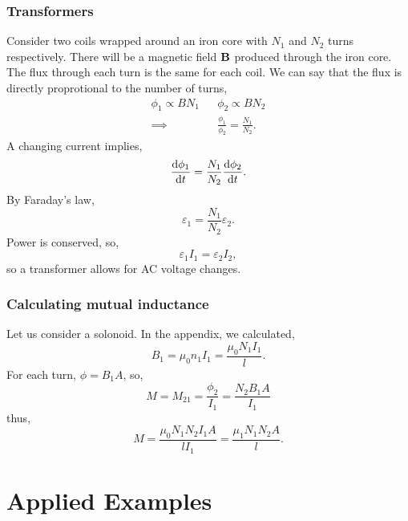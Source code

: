 \documentclass{book}
\begin{document}
\subsection{Transformers}
Consider two coils wrapped around an iron core with $N_1$ and $N_2$ turns respectively. There will be a magnetic field $\vb{B}$ produced through the iron core. The flux through each turn is the same for each coil. We can say that the flux is directly proprotional to the number of turns,
\begin{align}
	\phi_1 \propto BN_1 && \phi_2 \propto BN_2 \\
	\implies && \frac{\phi_1}{\phi_2} = \frac{N_1}{N_2}.
\end{align}
A changing current implies,
\begin{equation}
	\dv{\phi_1}{t} = \frac{N_1}{N_2}\dv{\phi_2}{t}.
\end{equation}
By Faraday's law,
\begin{equation}
	\varepsilon_1 = \frac{N_1}{N_2}\varepsilon_2.
\end{equation}
Power is conserved, so,
\begin{equation}
	\varepsilon_1 I_1 = \varepsilon_2 I_2,
\end{equation}
so a transformer allows for AC voltage changes.
\subsection{Calculating mutual inductance}
Let us consider a solonoid. In the appendix, we calculated,
\begin{equation}
	B_1 = \mu_0 n_1 I_1 = \frac{\mu_0 N_1 I_1}{l}.
\end{equation}
For each turn, $\phi = B_1 A$, so,
\begin{equation}
	M = M_21 = \frac{\phi_2}{I_1} = \frac{N_2B_1A}{I_1}
\end{equation}
thus,
\begin{equation}
	M = \frac{\mu_0N_1N_2I_1A}{lI_1} = \frac{\mu_1N_1N_2A}{l}.
\end{equation}
\appendix
\chapter{Applied Examples}
\end{document}
